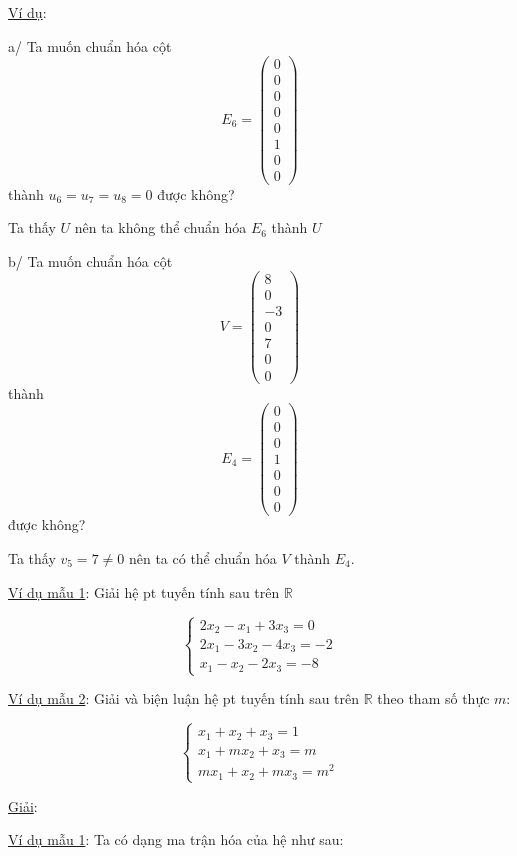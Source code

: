 \documentclass[12pt,a4paper]{article}
\let\ul\uline
\begin{document}
\ul{Ví dụ}:

a/ Ta muốn chuẩn hóa cột $$E_6 = \begin{pmatrix} 0 \\ 0 \\ 0 \\ 0 \\ 0 \\ 1 \\ 0 \\ 0 \end{pmatrix}$$ thành
$u_6 = u_7 = u_8 = 0$ được không?

Ta thấy $U$ nên ta không thể chuẩn hóa
$E_6$ thành
$U$

b/ Ta muốn chuẩn hóa cột $$V = \begin{pmatrix} 8 \\ 0 \\ -3 \\ 0 \\ 7 \\ 0 \\ 0 \end{pmatrix}$$ thành
$$E_4 = \begin{pmatrix} 0 \\ 0 \\ 0 \\ 1 \\ 0 \\ 0 \\ 0 \end{pmatrix}$$ được không?

Ta thấy $v_5 = 7 \neq 0$ nên ta có thể chuẩn hóa
$V$ thành
$E_4$.

\ul{Ví dụ mẫu 1}: Giải hệ pt tuyến tính sau trên
$\mathbb{R}$

$$\begin{cases} 2x_2 - x_1 + 3x_3 = 0 \\ 2x_1 - 3x_2 - 4x_3 = -2 \\ x_1 - x_2 - 2x_3 = -8 \end{cases}$$

\ul{Ví dụ mẫu 2}: Giải và biện luận hệ pt tuyến tính sau trên
$\mathbb{R}$ theo tham số thực
$m$:

$$\begin{cases} x_1 + x_2 + x_3 = 1 \\ x_1 + mx_2 + x_3 = m \\ mx_1 + x_2 + mx_3 = m^2 \end{cases}$$

\ul{Giải}:

\ul{Ví dụ mẫu 1}: Ta có dạng ma trận hóa của hệ như sau:
\end{document}
